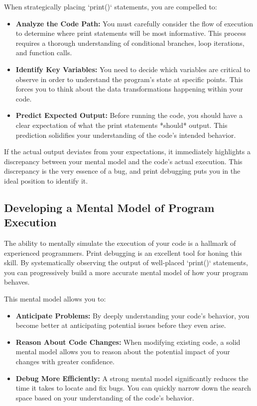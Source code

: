 \documentclass{article}
\begin{document}
{{{{When strategically placing `print()` statements, you are compelled to:

\begin{itemize}
    \item \textbf{Analyze the Code Path:} You must carefully consider the flow of execution to determine where print statements will be most informative. This process requires a thorough understanding of conditional branches, loop iterations, and function calls.
    \item \textbf{Identify Key Variables:} You need to decide which variables are critical to observe in order to understand the program's state at specific points. This forces you to think about the data transformations happening within your code.
    \item \textbf{Predict Expected Output:} Before running the code, you should have a clear expectation of what the print statements *should* output. This prediction solidifies your understanding of the code's intended behavior.
\end{itemize}

If the actual output deviates from your expectations, it immediately highlights a discrepancy between your mental model and the code's actual execution. This discrepancy is the very essence of a bug, and print debugging puts you in the ideal position to identify it.

\subsection*{Developing a Mental Model of Program Execution}

The ability to mentally simulate the execution of your code is a hallmark of experienced programmers. Print debugging is an excellent tool for honing this skill. By systematically observing the output of well-placed `print()` statements, you can progressively build a more accurate mental model of how your program behaves.

This mental model allows you to:

\begin{itemize}
    \item \textbf{Anticipate Problems:} By deeply understanding your code's behavior, you become better at anticipating potential issues before they even arise.
    \item \textbf{Reason About Code Changes:} When modifying existing code, a solid mental model allows you to reason about the potential impact of your changes with greater confidence.
    \item \textbf{Debug More Efficiently:} A strong mental model significantly reduces the time it takes to locate and fix bugs. You can quickly narrow down the search space based on your understanding of the code's behavior.
\end{itemize}

}}}}
\end{document}
